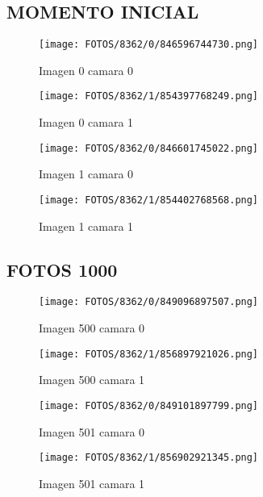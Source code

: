 \documentclass{article}
\begin{document}
\subsection{MOMENTO INICIAL}

\begin{figure}[H]
  \centering
  \begin{minipage}[b]{0.45\textwidth}
    \centering
    \texttt{[image: FOTOS/8362/0/846596744730.png]}
    \caption{Imagen 0 camara 0}
  \end{minipage}
  \begin{minipage}[b]{0.45\textwidth}
    \centering
    \texttt{[image: FOTOS/8362/1/854397768249.png]}
    \caption{Imagen 0 camara 1}
  \end{minipage}
  \begin{minipage}[b]{0.45\textwidth}
    \centering
    \texttt{[image: FOTOS/8362/0/846601745022.png]}
    \caption{Imagen 1 camara 0}
  \end{minipage}
  \begin{minipage}[b]{0.45\textwidth}
    \centering
    \texttt{[image: FOTOS/8362/1/854402768568.png]}
    \caption{Imagen 1 camara 1}
  \end{minipage}
\end{figure}

\subsection{FOTOS 1000}

\begin{figure}[H]
  \centering
  \begin{minipage}[b]{0.45\textwidth}
    \centering
    \texttt{[image: FOTOS/8362/0/849096897507.png]}
    \caption{Imagen 500 camara 0}
  \end{minipage}
  \begin{minipage}[b]{0.45\textwidth}
    \centering
    \texttt{[image: FOTOS/8362/1/856897921026.png]}
    \caption{Imagen 500 camara 1}
  \end{minipage}
  \begin{minipage}[b]{0.45\textwidth}
    \centering
    \texttt{[image: FOTOS/8362/0/849101897799.png]}
    \caption{Imagen 501 camara 0}
  \end{minipage}
  \begin{minipage}[b]{0.45\textwidth}
    \centering
    \texttt{[image: FOTOS/8362/1/856902921345.png]}
    \caption{Imagen 501 camara 1}
  \end{minipage}
\end{figure}
\end{document}
